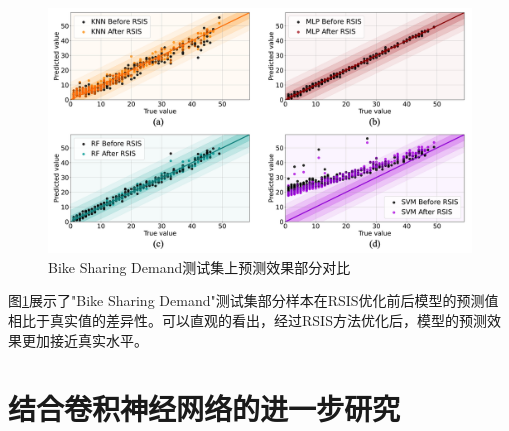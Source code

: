 \documentclass{NauThesis}
\begin{document}
\begin{figure}[htbp]
    \centering
    \includegraphics[width=1.0\textwidth]{figs/fig6.png}
    \caption{Bike Sharing Demand测试集上预测效果部分对比}
    \label{fig6}
\end{figure}
图\ref{fig6}展示了"Bike Sharing Demand"测试集部分样本在RSIS优化前后模型的预测值相比于真实值的差异性。可以直观的看出，经过RSIS方法优化后，模型的预测效果更加接近真实水平。

\chapter{结合卷积神经网络的进一步研究}
\end{document}
